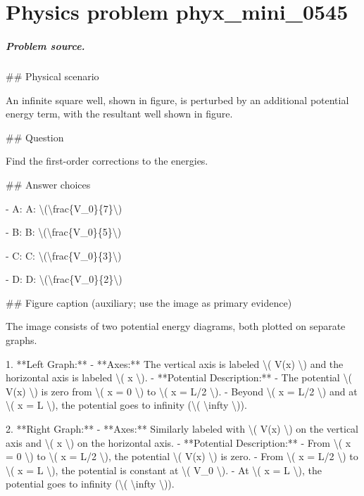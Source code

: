 
\chapter{Physics problem phyx\_mini\_0545}
\label{ch:PhyXMiniProblems_problem_phyx_mini_0545}

\paragraph{Problem source.}
\#\# Physical scenario

An infinite square well, shown in figure, is perturbed by an additional potential energy term, with the resultant well shown in figure.

\#\# Question

Find the first-order corrections to the energies.

\#\# Answer choices

- A: A: \textbackslash{}(\textbackslash{}frac\{V\_0\}\{7\}\textbackslash{})

- B: B: \textbackslash{}(\textbackslash{}frac\{V\_0\}\{5\}\textbackslash{})

- C: C: \textbackslash{}(\textbackslash{}frac\{V\_0\}\{3\}\textbackslash{})

- D: D: \textbackslash{}(\textbackslash{}frac\{V\_0\}\{2\}\textbackslash{})

\#\# Figure caption (auxiliary; use the image as primary evidence)

The image consists of two potential energy diagrams, both plotted on separate graphs.

1. **Left Graph:**
   - **Axes:** The vertical axis is labeled \textbackslash{}( V(x) \textbackslash{}) and the horizontal axis is labeled \textbackslash{}( x \textbackslash{}).
   - **Potential Description:** 
     - The potential \textbackslash{}( V(x) \textbackslash{}) is zero from \textbackslash{}( x = 0 \textbackslash{}) to \textbackslash{}( x = L/2 \textbackslash{}).
     - Beyond \textbackslash{}( x = L/2 \textbackslash{}) and at \textbackslash{}( x = L \textbackslash{}), the potential goes to infinity (\textbackslash{}( \textbackslash{}infty \textbackslash{})).

2. **Right Graph:**
   - **Axes:** Similarly labeled with \textbackslash{}( V(x) \textbackslash{}) on the vertical axis and \textbackslash{}( x \textbackslash{}) on the horizontal axis.
   - **Potential Description:** 
     - From \textbackslash{}( x = 0 \textbackslash{}) to \textbackslash{}( x = L/2 \textbackslash{}), the potential \textbackslash{}( V(x) \textbackslash{}) is zero.
     - From \textbackslash{}( x = L/2 \textbackslash{}) to \textbackslash{}( x = L \textbackslash{}), the potential is constant at \textbackslash{}( V\_0 \textbackslash{}).
     - At \textbackslash{}( x = L \textbackslash{}), the potential goes to infinity (\textbackslash{}( \textbackslash{}infty \textbackslash{})).

